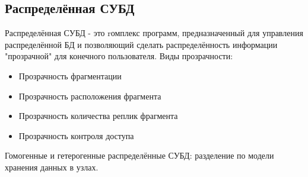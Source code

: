 \documentclass{article}
\begin{document}
\subsection{Распределённая СУБД}

Распределённая СУБД - это rомплекс программ, предназначенный для управления распределённой БД и позволяющий сделать распределённость информации "прозрачной" для конечного пользователя.
\newline Виды прозрачности:
\begin{itemize}
    \item Прозрачность фрагментации
    \item Прозрачность расположения фрагмента
    \item Прозрачность количества реплик фрагмента
    \item Прозрачность контроля доступа
\end{itemize}
Гомогенные и гетерогенные распределённые СУБД: разделение по модели хранения данных в узлах.
\newpage
\end{document}
